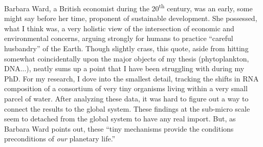 Barbara Ward, a British economist during the 20\textsuperscript{th} century, was an early, some might say before her time, proponent of sustainable development. She possessed, what I think was, a very holistic view of the intersection of economic and environmental concerns, arguing strongly for humans to practice ``careful husbandry'' of the Earth. Though slightly crass, this quote, aside from hitting somewhat coincidentally upon the major objects of my thesis (phytoplankton, DNA...), neatly sums up a point that I have been struggling with during my PhD. For my research, I dove into the smallest detail, tracking the shifts in RNA composition of a consortium of very tiny organisms living within a very small parcel of water. After analyzing these data, it was hard to figure out a way to connect the results to the global system. These findings at the sub-micro scale seem to detached from the global system to have any real import. But, as Barbara Ward points out, these ``tiny mechanisms provide the conditions preconditions of \textit{our} planetary life.'' 
